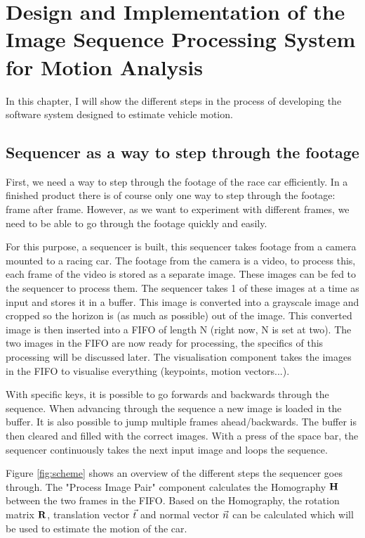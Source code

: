 \chapter{Design and Implementation of the Image Sequence Processing System for Motion Analysis}\label{chap:system_implementation}

In this chapter, I will show the different steps in the process of developing the software system designed to estimate vehicle motion.

\section{Sequencer as a way to step through the footage}
First, we need a way to step through the footage of the race car efficiently. In a finished product there is of course only one way to step through the footage: frame after frame. However, as we want to experiment with different frames, we need to be able to go through the footage quickly and easily.\bigskip

For this purpose, a sequencer is built, this sequencer takes footage from a camera mounted to a racing car. The footage from the camera is a video, to process this, each frame of the video is stored as a separate image. These images can be fed to the sequencer to process them. The sequencer takes 1 of these images at a time as input and stores it in a buffer. This image is converted into a grayscale image and cropped so the horizon is (as much as possible) out of the image. This converted image is then inserted into a FIFO of length N (right now, N is set at two). The two images in the FIFO are now ready for processing, the specifics of this processing will be discussed later. The visualisation component takes the images in the FIFO to visualise everything (keypoints, motion vectors...).\bigskip

With specific keys, it is possible to go forwards and backwards through the sequence. When advancing through the sequence a new image is loaded in the buffer. It is also possible to jump multiple frames ahead/backwards. The buffer is then cleared and filled with the correct images. With a press of the space bar, the sequencer continuously takes the next input image and loops the sequence.\bigskip

Figure \autoref{fig:scheme} shows an overview of the different steps the sequencer goes through. The "Process Image Pair" component calculates the Homography $\mathbf{H}$ between the two frames in the FIFO. Based on the Homography, the rotation matrix $\mathbf{R}$, translation vector $\vec t$ and normal vector $\vec n$ can be calculated which will be used to estimate the motion of the car.

